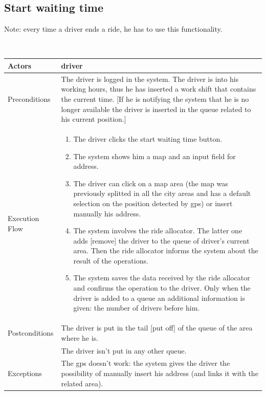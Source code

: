 \subsection{Start waiting time}
\begin{footnotesize}
	Note: every time a driver ends a ride, he has to use this functionality.
\end{footnotesize}\\
\begin{tabular}{lp{8cm}}
	\hline 
	Actors & \Gls{driver}  \\ \hline
	Preconditions & The driver is logged in the system. The driver is into his working hours, thus he has inserted a work shift that contains the current time. [If he is notifying the system that he is no longer available the driver is inserted in the queue related to his current position.] \\ \hline
	Execution Flow &  \begin{enumerate}
					\item The driver clicks the start waiting time button.
					\item The system shows him a \gls{map} and an input field for address.
					\item The driver can click on a \gls{map} area (the \gls{map} was previously splitted in all the city areas and has a default selection on the position detected by \gls{gps}) or insert manually his address.
					\item The system involves the ride allocator. The latter one adds [remove] the driver to the queue of driver's current area. Then the ride allocator informs the system about the result of the operations.
					\item The system saves the data received by the ride allocator and confirms the operation to the driver. Only when the driver is added to a queue an additional information is given: the number of drivers before him.
				\end{enumerate}
	 \\ \hline
	 Postconditions & The driver is put in the tail [put off] of the queue of the area where he is.\\
	 				& The driver isn't put in any other queue. \\ \hline
	 Exceptions &  The \gls{gps} doesn't work: the system gives the driver the possibility of manually insert his address (and links it with the related area). \\ \hline
\end{tabular}


